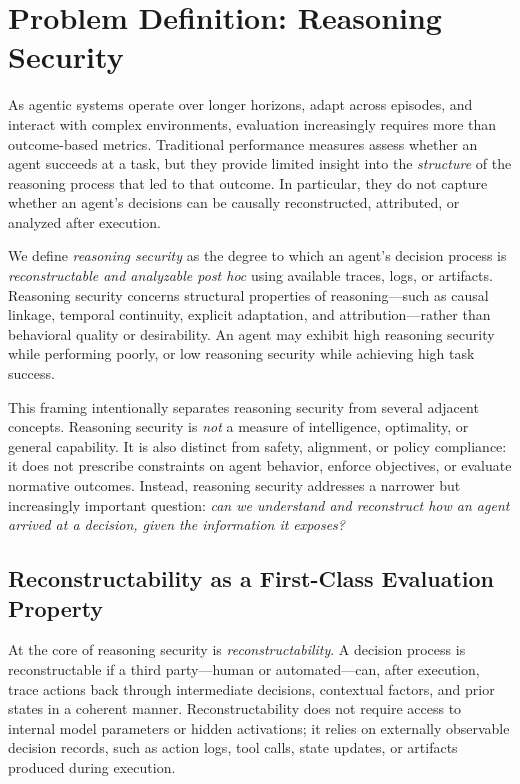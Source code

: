 \section{Problem Definition: Reasoning Security}
As agentic systems operate over longer horizons, adapt across episodes, and interact with complex environments, evaluation increasingly requires more than outcome-based metrics. Traditional performance measures assess whether an agent succeeds at a task, but they provide limited insight into the \emph{structure} of the reasoning process that led to that outcome. In particular, they do not capture whether an agent’s decisions can be causally reconstructed, attributed, or analyzed after execution.

We define \emph{reasoning security} as the degree to which an agent’s decision process is \emph{reconstructable and analyzable post hoc} using available traces, logs, or artifacts. Reasoning security concerns structural properties of reasoning---such as causal linkage, temporal continuity, explicit adaptation, and attribution---rather than behavioral quality or desirability. An agent may exhibit high reasoning security while performing poorly, or low reasoning security while achieving high task success.

This framing intentionally separates reasoning security from several adjacent concepts. Reasoning security is \emph{not} a measure of intelligence, optimality, or general capability. It is also distinct from safety, alignment, or policy compliance: it does not prescribe constraints on agent behavior, enforce objectives, or evaluate normative outcomes. Instead, reasoning security addresses a narrower but increasingly important question: \emph{can we understand and reconstruct how an agent arrived at a decision, given the information it exposes?}

\subsection{Reconstructability as a First-Class Evaluation Property}
At the core of reasoning security is \emph{reconstructability}. A decision process is reconstructable if a third party---human or automated---can, after execution, trace actions back through intermediate decisions, contextual factors, and prior states in a coherent manner. Reconstructability does not require access to internal model parameters or hidden activations; it relies on externally observable decision records, such as action logs, tool calls, state updates, or artifacts produced during execution.

